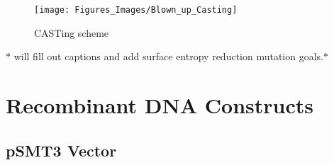 \documentclass[12pt,twoside]{reedthesis}
\begin{document}
		 	\begin{figure}[h]
		 		
		 		\centering
		 		\texttt{[image: Figures\_Images/Blown\_up\_Casting]}
		 		\caption[Binding Reaction and Immunoprecipitation Scheme ]{CASTing scheme}
		 		\label{CASTingScheme}
		 	\end{figure}
		 	
		 	$*$ will fill out captions and add surface entropy reduction mutation goals.$*$
		 

   \section{Recombinant DNA Constructs}
   
   \subsection{pSMT3 Vector}
   
\end{document}
